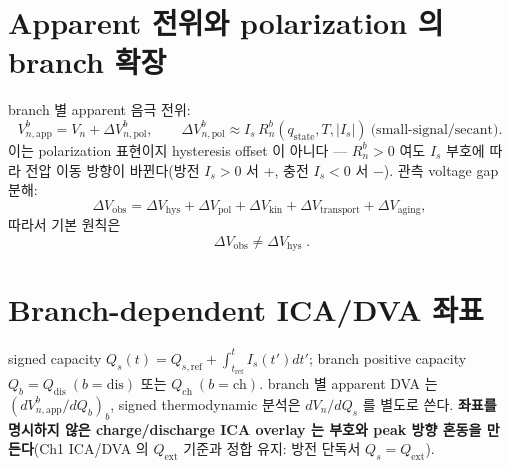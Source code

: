 \documentclass[11pt,a4paper]{article}
\newcommand{\app}{\mathrm{app}}
\newcommand{\ext}{\mathrm{ext}}
\newcommand{\transp}{\mathrm{transport}}
\newcommand{\dis}{\mathrm{dis}}
\newcommand{\chg}{\mathrm{ch}}
\newcommand{\hys}{\mathrm{hys}}
\newcommand{\pol}{\mathrm{pol}}
\newcommand{\kin}{\mathrm{kin}}
\newcommand{\obs}{\mathrm{obs}}
\newcommand{\stt}{\mathrm{state}}
\begin{document}
\section{Apparent 전위와 polarization 의 branch 확장}\label{sec:ch5_apparent}
branch 별 apparent 음극 전위:
\begin{equation}
V_{n,\app}^b=V_n+\Delta V_{n,\pol}^b,\qquad \Delta V_{n,\pol}^b\approx I_s\,R_n^b(q_\stt,T,|I_s|)\ \text{(small-signal/secant)}.
\label{eq:ch5_vapp_branch}
\end{equation}
이는 polarization 표현이지 hysteresis offset 이 아니다 — $R_n^b>0$ 여도 $I_s$ 부호에 따라 전압 이동 방향이
바뀐다(방전 $I_s>0$ 서 +, 충전 $I_s<0$ 서 $-$). 관측 voltage gap 분해:
\begin{equation}
\Delta V_\obs=\Delta V_\hys+\Delta V_\pol+\Delta V_\kin+\Delta V_\transp+\Delta V_{\mathrm{aging}},
\label{eq:ch5_gap_decomp}
\end{equation}
따라서 기본 원칙은
\begin{equation}
\boxed{\;\Delta V_\obs\ne\Delta V_\hys\;.}
\label{eq:ch5_obs_not_hys}
\end{equation}

\section{Branch-dependent ICA/DVA 좌표}\label{sec:ch5_icadva}
signed capacity $Q_s(t)=Q_{s,\mathrm{ref}}+\int_{t_{\mathrm{ref}}}^t I_s(t')dt'$; branch positive capacity
$Q_b=Q_\dis\ (b=\dis)$ 또는 $Q_\chg\ (b=\chg)$. branch 별 apparent DVA 는 $(dV_{n,\app}^b/dQ_b)_b$, signed
thermodynamic 분석은 $dV_n/dQ_s$ 를 별도로 쓴다. \textbf{좌표를 명시하지 않은 charge/discharge ICA overlay 는
부호와 peak 방향 혼동을 만든다}(Ch1 ICA/DVA 의 $Q_\ext$ 기준과 정합 유지: 방전 단독서 $Q_s=Q_\ext$).

\end{document}

